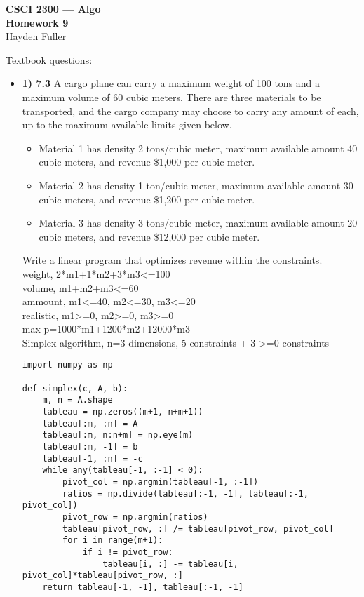 \documentclass[11pt]{article}
\def\a{\alpha}
\def\b{\beta}
\def\g{\gamma}
\def\d{\delta}
\begin{document}
\thispagestyle{empty}   %


\begin{center}
\large
\textbf{CSCI 2300 --- Algo \\
Homework 9}
\\Hayden Fuller 
\end{center}

Textbook questions:

\begin{itemize}
\item \textbf{1) 7.3}
A cargo plane can carry a maximum weight of 100 tons and a maximum volume of 60 cubic meters. There are three materials to be transported, and the cargo company may choose to carry any amount of each, up to the maximum available limits given below.
\begin{itemize}
\item Material 1 has density 2 tons/cubic meter, maximum available amount 40 cubic meters, and revenue \$1,000 per cubic meter.
\item Material 2 has density 1 ton/cubic meter, maximum available amount 30 cubic meters, and revenue \$1,200 per cubic meter.
\item Material 3 has density 3 tons/cubic meter, maximum available amount 20 cubic meters, and revenue \$12,000 per cubic meter.
\end{itemize}
Write a linear program that optimizes revenue within the constraints.
\\weight, 2*m1+1*m2+3*m3<=100
\\volume, m1+m2+m3<=60
\\ammount, m1<=40, m2<=30, m3<=20
\\realistic, m1>=0, m2>=0, m3>=0
\\max p=1000*m1+1200*m2+12000*m3
\\Simplex algorithm, n=3 dimensions, 5 constraints + 3 >=0 constraints
\begin{verbatim}
import numpy as np

def simplex(c, A, b):
    m, n = A.shape
    tableau = np.zeros((m+1, n+m+1))
    tableau[:m, :n] = A
    tableau[:m, n:n+m] = np.eye(m)
    tableau[:m, -1] = b
    tableau[-1, :n] = -c
    while any(tableau[-1, :-1] < 0):
        pivot_col = np.argmin(tableau[-1, :-1])
        ratios = np.divide(tableau[:-1, -1], tableau[:-1, pivot_col])
        pivot_row = np.argmin(ratios)
        tableau[pivot_row, :] /= tableau[pivot_row, pivot_col]
        for i in range(m+1):
            if i != pivot_row:
                tableau[i, :] -= tableau[i, pivot_col]*tableau[pivot_row, :]
    return tableau[-1, -1], tableau[:-1, -1]


\end{verbatim}
\end{itemize}
\end{document}
